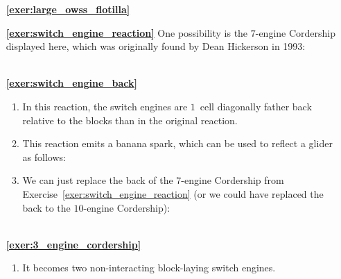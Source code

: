 \begin{multicols}{2}
\begin{itemize}[leftmargin=0em]
\begin{enumerate}[leftmargin=1.5em,label=\bf\color{ocre}(\alph*)]
			\item {}
			
			\item {} \\
		\end{enumerate}
		

	\item[\bf\color{ocre}\sffamily\ref{exer:large_owss_flotilla}]  \\


	\item[\bf\color{ocre}\sffamily\ref{exer:switch_engine_reaction}] One possibility is the $7$-engine Cordership displayed here, which was originally found by Dean Hickerson in 1993: \\[-0.6em]
	
	 \\


	\item[\bf\color{ocre}\sffamily\ref{exer:switch_engine_back}]
	\begin{enumerate}[leftmargin=1.5em,label=\bf\color{ocre}(\alph*)]
		\item In this reaction, the switch engines are $1$~cell diagonally father back relative to the blocks than in the original reaction.
		
		\item This reaction emits a banana spark, which can be used to reflect a glider as follows: \\[-0.6em]
		
		
		\item We can just replace the back of the $7$-engine Cordership from Exercise~\ref{exer:switch_engine_reaction} (or we could have replaced the back to the $10$-engine Cordership): \\[-0.6em]
		
		 \\
	\end{enumerate}
	
	
	\item[\bf\color{ocre}\sffamily\ref{exer:3_engine_cordership}]
		\begin{enumerate}[leftmargin=1.5em,label=\bf\color{ocre}(\alph*)]
			\item It becomes two non-interacting block-laying switch engines.
			

\end{enumerate}
\end{itemize}
\end{multicols}
